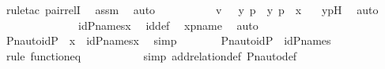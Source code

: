 \begin{isabellebody}
\ {\isacharparenleft}{\kern0pt}rule{\isacharunderscore}{\kern0pt}tac\ pair{\isacharunderscore}{\kern0pt}relI{\isacharparenright}{\kern0pt}\ \isamarkupfalse%
\ assm\ \isamarkupfalse%
\ auto\ \isanewline
\ \ \ \ \ \ \isamarkupfalse%
\ \isamarkupfalse%
\ {\isachardoublequoteopen}v\ {\isasymin}\ {\isacharbraceleft}{\kern0pt}\ {\isacharless}{\kern0pt}y{\isacharcomma}{\kern0pt}\ p{\isachargreater}{\kern0pt}\ {\isachardot}{\kern0pt}\ {\isacharless}{\kern0pt}y{\isacharcomma}{\kern0pt}\ p{\isachargreater}{\kern0pt}\ {\isasymin}\ x\ {\isacharbraceright}{\kern0pt}{\isachardoublequoteclose}\ \isamarkupfalse%
\ ypH\ \isamarkupfalse%
\ auto\ \isanewline
\ \ \ \ \isamarkupfalse%
\isanewline
\ \ \ \ \isamarkupfalse%
\ \isamarkupfalse%
\ {\isachardoublequoteopen}{\isachardot}{\kern0pt}{\isachardot}{\kern0pt}{\isachardot}{\kern0pt}\ {\isacharequal}{\kern0pt}\ id{\isacharparenleft}{\kern0pt}P{\isacharunderscore}{\kern0pt}names{\isacharparenright}{\kern0pt}{\isacharbackquote}{\kern0pt}x{\isachardoublequoteclose}\ \isamarkupfalse%
\ id{\isacharunderscore}{\kern0pt}def\ \isamarkupfalse%
\ xpname\ \isamarkupfalse%
\ auto\isanewline
\ \ \ \ \isamarkupfalse%
\ \isamarkupfalse%
\ {\isachardoublequoteopen}Pn{\isacharunderscore}{\kern0pt}auto{\isacharparenleft}{\kern0pt}id{\isacharparenleft}{\kern0pt}P{\isacharparenright}{\kern0pt}{\isacharparenright}{\kern0pt}\ {\isacharbackquote}{\kern0pt}\ x\ {\isacharequal}{\kern0pt}\ id{\isacharparenleft}{\kern0pt}P{\isacharunderscore}{\kern0pt}names{\isacharparenright}{\kern0pt}{\isacharbackquote}{\kern0pt}x{\isachardoublequoteclose}\ \isamarkupfalse%
\ simp\ \isanewline
\ \ \isamarkupfalse%
\isanewline
\isanewline
\ \ \isamarkupfalse%
\ {\isachardoublequoteopen}Pn{\isacharunderscore}{\kern0pt}auto{\isacharparenleft}{\kern0pt}id{\isacharparenleft}{\kern0pt}P{\isacharparenright}{\kern0pt}{\isacharparenright}{\kern0pt}\ {\isacharequal}{\kern0pt}\ id{\isacharparenleft}{\kern0pt}P{\isacharunderscore}{\kern0pt}names{\isacharparenright}{\kern0pt}{\isachardoublequoteclose}\ \isanewline
\ \ \ \ \isamarkupfalse%
\ {\isacharparenleft}{\kern0pt}rule\ function{\isacharunderscore}{\kern0pt}eq{\isacharparenright}{\kern0pt}\ \isanewline
\ \ \ \ \ \ \ \ \ \isamarkupfalse%
{\isacharparenleft}{\kern0pt}simp\ add{\isacharcolon}{\kern0pt}relation{\isacharunderscore}{\kern0pt}def\ Pn{\isacharunderscore}{\kern0pt}auto{\isacharunderscore}{\kern0pt}def{\isacharparenright}{\kern0pt}\isanewline

\end{isabellebody}
